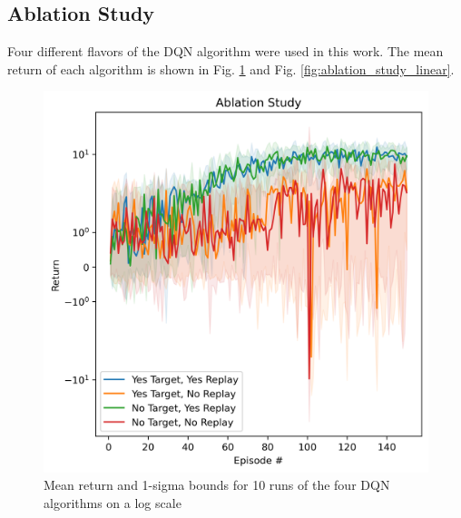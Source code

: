 \documentclass[conference]{IEEEtran}
\begin{document}
\subsection{Ablation Study}
Four different flavors of the DQN algorithm were used in this work. The mean return of each algorithm is shown in Fig. \ref{fig:ablation_study_log} and Fig. \ref{fig:ablation_study_linear}.

\begin{figure}[h]
\centering
\includegraphics[width=\linewidth]{../figures/results/mean_return_ablation_study_log_True.png}
\caption{Mean return and 1-sigma bounds for 10 runs of the four DQN algorithms on a log scale}
\label{fig:ablation_study_log}
\end{figure}
\end{document}
